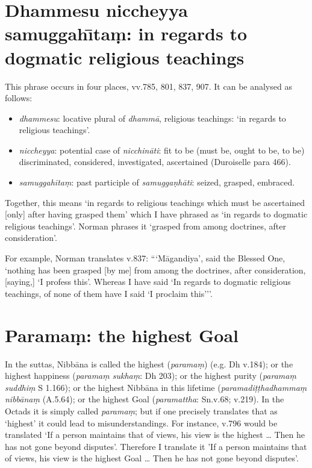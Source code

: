 \section*{Dhammesu niccheyya samuggah\={\i}ta\d{m}: in regards to dogmatic religious teachings}\label{transl-dogmatic-religious-teachings}

This phrase occurs in four places, vv.785, 801, 837, 907. It can be analysed as follows:

\begin{itemize}
\item \textit{dhammesu}: locative plural of \textit{dhammā}, religious teachings: `in regards to religious teachings'.
\item \textit{niccheyya}: potential case of \textit{nicchināti}: fit to be (must be, ought to be, to be) discriminated, considered, investigated, ascertained (Duroiselle para 466).
\item \textit{samuggahītaṃ}: past participle of \textit{samuggaṇhāti}: seized, grasped, embraced.
\end{itemize}

Together, this means `in regards to religious teachings which must be ascertained [only] after having grasped them' which I have phrased as `in regards to dogmatic religious teachings'. Norman phrases it `grasped from among doctrines, after consideration'.

For example, Norman translates v.837: ``\thinspace`Māgandiya', said the Blessed One, `nothing has been grasped [by me] from among the doctrines, after consideration, [saying,] `I profess this'. Whereas I have said `In regards to dogmatic religious teachings, of none of them have I said `I proclaim this'\thinspace''.

\section*{Parama\d{m}: the highest Goal}\label{transl-highest-goal}

In the suttas, Nibbāna is called the highest (\textit{paramaṃ}) (e.g. Dh v.184); or the highest happiness (\textit{paramaṃ sukhaṃ}: Dh 203); or the highest purity (\textit{paramaṃ suddhiṃ} S 1.166); or the highest Nibbāna in this lifetime (\textit{paramadiṭṭhadhammaṃ nibbānaṃ} (A.5.64); or the highest Goal (\textit{paramattha}: Sn.v.68; v.219). In the Octads it is simply called \textit{paramaṃ}; but if one precisely translates that as `highest' it could lead to misunderstandings. For instance, v.796 would be translated `If a person maintains that of views, his view is the highest \ldots{} Then he has not gone beyond disputes'. Therefore I translate it 'If a person maintains that of views, his view is the highest Goal \ldots{} Then he has not gone beyond disputes'.

